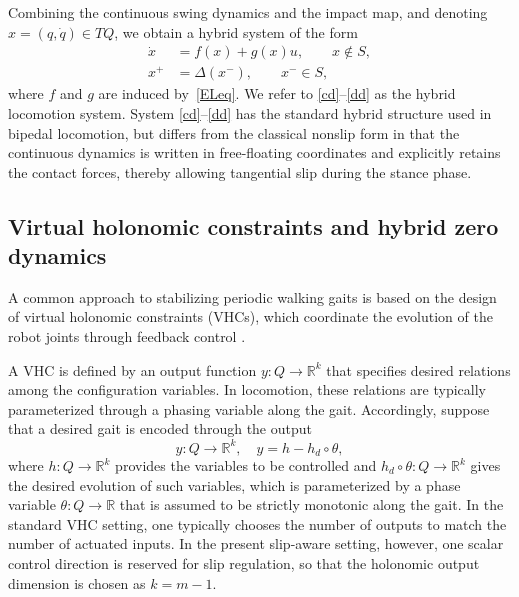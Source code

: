 \documentclass[letterpaper, 10 pt, conference]{ieeeconf}
\begin{document}
Combining the continuous swing dynamics and the impact map, and denoting $x=(q,\dot q)\in TQ$, we obtain a hybrid system of the form
\begin{align}
\dot x &= f(x)+g(x)u, \qquad x\notin S,\label{cd}\\
x^+ &= \Delta(x^-), \qquad x^- \in S,\label{dd}
\end{align}
where $f$ and $g$ are induced by~\eqref{ELeq}. We refer to \eqref{cd}--\eqref{dd} as the hybrid locomotion system. System \eqref{cd}--\eqref{dd} has the standard hybrid structure used in bipedal locomotion, but differs from the classical nonslip form in that the continuous dynamics is written in free-floating coordinates and explicitly retains the contact forces, thereby allowing tangential slip during the stance phase.




\subsection{Virtual holonomic constraints and hybrid zero dynamics}

A common approach to stabilizing periodic walking gaits is based on the
design of virtual holonomic constraints (VHCs), which coordinate
the evolution of the robot joints through feedback control
\cite{Westervelt2007, ames2012first}.

A VHC is defined by an output function $y:Q \to \mathbb{R}^k$ that specifies desired relations among the configuration variables.
In locomotion, these relations are typically parameterized
through a phasing variable along the gait. Accordingly, suppose that a desired gait is encoded through the output
\begin{equation}\label{VHC}
y:Q\to\mathbb R^k,\quad y = h - h_d\circ\theta,
\end{equation}
where $h:Q\to\mathbb{R}^k$ provides the variables to be controlled and
$h_d\circ\theta:Q\to\mathbb R^k$ gives the desired evolution of such variables, which is parameterized by a phase
variable $\theta:Q\to\mathbb R$ that is assumed to be strictly
monotonic along the gait. In the standard VHC setting, one typically chooses the number of outputs to match the number of actuated inputs. In the present slip-aware setting, however, one scalar control direction is reserved for slip regulation, so that the holonomic output dimension is chosen as $k=m-1$.
\end{document}
